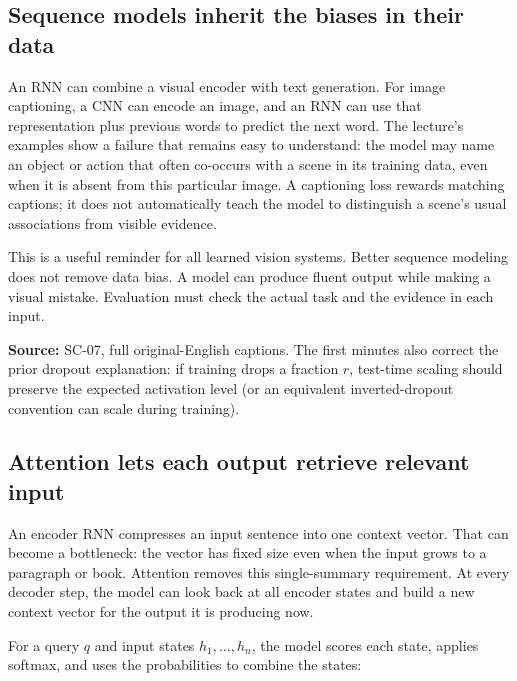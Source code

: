 \subsection{Sequence models inherit the biases in their data}\label{04-visual-computing-ii-ch031-sequence-models-inherit-the-biases-in-their-data}

\hypertarget{04-visual-computing-ii-ch031-sequence-models-inherit-the-biases-in-their-data}{}

An RNN can combine a visual encoder with text generation. For image captioning, a CNN can encode an image, and an RNN can use that representation plus previous words to predict the next word. The lecture's examples show a failure that remains easy to understand: the model may name an object or action that often co-occurs with a scene in its training data, even when it is absent from this particular image. A captioning loss rewards matching captions; it does not automatically teach the model to distinguish a scene's usual associations from visible evidence.

This is a useful reminder for all learned vision systems. Better sequence modeling does not remove data bias. A model can produce fluent output while making a visual mistake. Evaluation must check the actual task and the evidence in each input.

\textbf{Source:} SC-07, full original-English captions. The first minutes also correct the prior dropout explanation: if training drops a fraction \(r\), test-time scaling should preserve the expected activation level (or an equivalent inverted-dropout convention can scale during training).

\subsection{Attention lets each output retrieve relevant input}\label{04-visual-computing-ii-ch031-attention-lets-each-output-retrieve-relevant-input}

\hypertarget{04-visual-computing-ii-ch031-attention-lets-each-output-retrieve-relevant-input}{}

An encoder RNN compresses an input sentence into one context vector. That can become a bottleneck: the vector has fixed size even when the input grows to a paragraph or book. Attention removes this single-summary requirement. At every decoder step, the model can look back at all encoder states and build a new context vector for the output it is producing now.

For a query \(q\) and input states \(h_1,\ldots,h_n\), the model scores each state, applies softmax, and uses the probabilities to combine the states:

